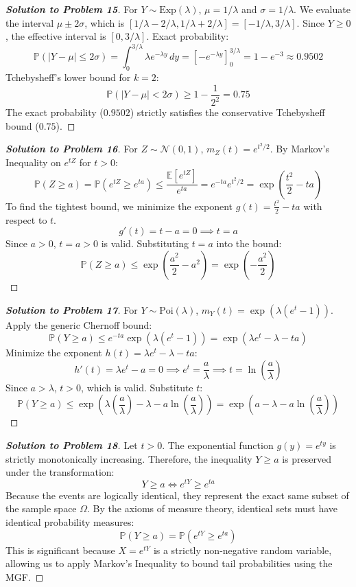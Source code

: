 \documentclass[11pt, a4paper]{article}
\theoremstyle{definition}
\theoremstyle{remark}
\newcommand{\E}{\mathbb{E}}
\newcommand{\Prob}{\mathbb{P}}
\begin{document}
\begin{proof}[\textbf{Solution to Problem 15}]
For $Y \sim \text{Exp}(\lambda)$, $\mu = 1/\lambda$ and $\sigma = 1/\lambda$.
We evaluate the interval $\mu \pm 2\sigma$, which is $[1/\lambda - 2/\lambda, 1/\lambda + 2/\lambda] = [-1/\lambda, 3/\lambda]$.
Since $Y \ge 0$, the effective interval is $[0, 3/\lambda]$.
Exact probability:
\[ \Prob(|Y - \mu| \le 2\sigma) = \int_{0}^{3/\lambda} \lambda e^{-\lambda y} \, dy = \left[ -e^{-\lambda y} \right]_0^{3/\lambda} = 1 - e^{-3} \approx 0.9502 \]
Tchebysheff's lower bound for $k=2$:
\[ \Prob(|Y - \mu| < 2\sigma) \ge 1 - \frac{1}{2^2} = 0.75 \]
The exact probability ($0.9502$) strictly satisfies the conservative Tchebysheff bound ($0.75$).
\end{proof}

\begin{proof}[\textbf{Solution to Problem 16}]
For $Z \sim \mathcal{N}(0,1)$, $m_Z(t) = e^{t^2/2}$.
By Markov's Inequality on $e^{tZ}$ for $t > 0$:
\[ \Prob(Z \ge a) = \Prob(e^{tZ} \ge e^{ta}) \le \frac{\E[e^{tZ}]}{e^{ta}} = e^{-ta} e^{t^2/2} = \exp\left(\frac{t^2}{2} - ta\right) \]
To find the tightest bound, we minimize the exponent $g(t) = \frac{t^2}{2} - ta$ with respect to $t$.
\[ g'(t) = t - a = 0 \implies t = a \]
Since $a > 0$, $t = a > 0$ is valid. Substituting $t = a$ into the bound:
\[ \Prob(Z \ge a) \le \exp\left(\frac{a^2}{2} - a^2\right) = \exp\left(-\frac{a^2}{2}\right) \]
\end{proof}

\begin{proof}[\textbf{Solution to Problem 17}]
For $Y \sim \text{Poi}(\lambda)$, $m_Y(t) = \exp(\lambda(e^t - 1))$.
Apply the generic Chernoff bound:
\[ \Prob(Y \ge a) \le e^{-ta} \exp(\lambda(e^t - 1)) = \exp(\lambda e^t - \lambda - ta) \]
Minimize the exponent $h(t) = \lambda e^t - \lambda - ta$:
\[ h'(t) = \lambda e^t - a = 0 \implies e^t = \frac{a}{\lambda} \implies t = \ln\left(\frac{a}{\lambda}\right) \]
Since $a > \lambda$, $t > 0$, which is valid. Substitute $t$:
\[ \Prob(Y \ge a) \le \exp\left( \lambda\left(\frac{a}{\lambda}\right) - \lambda - a\ln\left(\frac{a}{\lambda}\right) \right) = \exp\left( a - \lambda - a\ln\left(\frac{a}{\lambda}\right) \right) \]
\end{proof}

\begin{proof}[\textbf{Solution to Problem 18}]
Let $t > 0$. The exponential function $g(y) = e^{ty}$ is strictly monotonically increasing.
Therefore, the inequality $Y \ge a$ is preserved under the transformation:
\[ Y \ge a \iff e^{tY} \ge e^{ta} \]
Because the events are logically identical, they represent the exact same subset of the sample space $\Omega$. By the axioms of measure theory, identical sets must have identical probability measures:
\[ \Prob(Y \ge a) = \Prob(e^{tY} \ge e^{ta}) \]
This is significant because $X = e^{tY}$ is a strictly non-negative random variable, allowing us to apply Markov's Inequality to bound tail probabilities using the MGF.
\end{proof}
\end{document}
